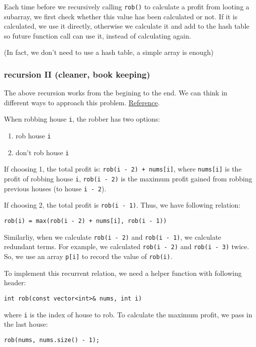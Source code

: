 \documentclass[12pt]{article}
\begin{document}
Each time before we recursively calling \texttt{rob()} to calculate a profit from looting a subarray, we first check whether this value has been calculated or not. If it is calculated, we use it directly, otherwise we calculate it and add to the hash table so future function call can use it, instead of calculating again.

(In fact, we don't need to use a hash table, a simple array is enough)
\subsubsection{recursion II (cleaner, book keeping)}
\label{sec:org5094c54}
The above recursion works from the begining to the end. We can think in different ways to approach this problem. \href{https://leetcode.com/problems/house-robber/discuss/156523/From-good-to-great.-How-to-approach-most-of-DP-problems.}{Reference}.

When robbing house \texttt{i}, the robber has two options:
\begin{enumerate}
\item rob house \texttt{i}
\item don't rob house \texttt{i}
\end{enumerate}

If choosing 1, the total profit is: \texttt{rob(i - 2) + nums[i]}, where \texttt{nums[i]} is the profit of robbing house \texttt{i}, \texttt{rob(i - 2)} is the maximum profit gained from robbing previous houses (to house \texttt{i - 2}).

If choosing 2, the total profit is \texttt{rob(i - 1)}. Thus, we have following relation:
\begin{verbatim}
rob(i) = max(rob(i - 2) + nums[i], rob(i - 1))
\end{verbatim}
Similarliy, when we calculate \texttt{rob(i - 2)} and \texttt{rob(i - 1)}, we calculate redundant terms. For example, we calculated \texttt{rob(i - 2)} and \texttt{rob(i - 3)} twice. So, we use an array \texttt{p[i]} to record the value of \texttt{rob(i)}.

To implement this recurrent relation, we need a helper function with following header:
\begin{verbatim}
int rob(const vector<int>& nums, int i)
\end{verbatim}
where \texttt{i} is the index of house to rob. To calculate the maximum profit, we pass in the last house:
\begin{verbatim}
rob(nums, nums.size() - 1);
\end{verbatim}
\end{document}
